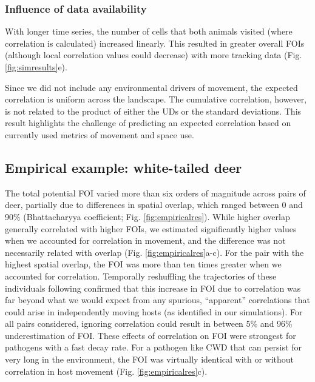 \documentclass[letterpaper]{article}
\begin{document}
\subsubsection*{Influence of data availability}

 
With longer time series, the number of cells that both animals visited (where correlation is calculated) increased linearly. This resulted in greater overall FOIs (although local correlation values could decrease) with more tracking data (Fig. \ref{fig:simresults}e). 

Since we did not include any environmental drivers of movement, the expected correlation is uniform across the landscape. The cumulative correlation, however, is not related to the product of either the UDs or the standard deviations. This result highlights the challenge of predicting an expected correlation based on currently used metrics of movement and space use.


\subsection*{Empirical example: white-tailed deer}

The total potential FOI varied more than six orders of magnitude across pairs of deer, partially due to differences in spatial overlap, which ranged between 0 and 90\% (Bhattacharyya coefficient; Fig. \ref{fig:empiricalres}). While higher overlap generally correlated with higher FOIs, we estimated significantly higher values when we accounted for correlation in movement, and the difference was not necessarily related with overlap (Fig. \ref{fig:empiricalres}a-c).  For the pair with the highest spatial overlap, the FOI was more than ten times greater when we accounted for correlation. Temporally reshuffling the trajectories of these individuals following \citet{Spiegel2016} confirmed that this increase in FOI due to correlation was far beyond what we would expect from any  spurious, ``apparent'' correlations that could arise in independently moving hosts (as identified in our simulations). For all pairs considered, ignoring correlation could result in between 5\% and 96\% underestimation of FOI. These effects of correlation on FOI were strongest for pathogens with a fast decay rate. For a pathogen like CWD that can persist for very long in the environment, the FOI was virtually identical with or without correlation in host movement (Fig. \ref{fig:empiricalres}c). 
\end{document}
